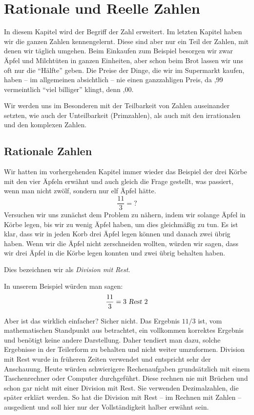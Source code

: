 

\chapter{Rationale und Reelle Zahlen}

In diesem Kapitel wird der Begriff der Zahl erweitert. Im letzten Kapitel haben wir die ganzen Zahlen kennengelernt. Diese sind aber nur ein Teil der Zahlen, mit denen wir täglich umgehen. Beim Einkaufen zum Beispiel besorgen wir zwar Äpfel und Milchtüten in ganzen Einheiten, aber schon beim Brot lassen wir uns oft nur die "`Hälfte"' geben. Die Preise der Dinge, die wir im Supermarkt kaufen, haben -- im allgemeinen absichtlich -- nie einen ganzzahligen Preis, da ,99 vermeintlich "`viel billiger"' klingt, denn ,00.

Wir werden uns im Besonderen mit der Teilbarkeit von Zahlen auseinander setzten, wie auch der Unteilbarkeit (Primzahlen), als auch mit den irrationalen und den komplexen Zahlen.

\section{Rationale Zahlen}

Wir hatten im vorhergehenden Kapitel immer wieder das Beispiel der drei Körbe mit den vier Äpfeln erwähnt und auch gleich die Frage gestellt, was passiert, wenn man nicht zwölf, sondern nur elf Äpfel hätte.
\[ \frac{11}{3} = ? \]
Versuchen wir uns zunächst dem Problem zu nähern, indem wir solange Äpfel in Körbe legen, bis wir zu wenig Äpfel haben, um dies gleichmäßig zu tun. Es ist klar, dass wir in jeden Korb drei Äpfel legen können und danach zwei übrig haben. Wenn wir die Äpfel nicht zerschneiden wollten, würden wir sagen, dass wir drei Äpfel in die Körbe legen konnten und zwei übrig behalten haben. 

\begin{definition}
Dies bezeichnen wir als \textsl{Division mit Rest}. 
\end{definition}
In unserem Beispiel würden man sagen:
\[ \frac{11}{3} = 3 \textsl{ Rest } 2 \]

Aber ist das wirklich einfacher? Sicher nicht. Das Ergebnis $11/3$ ist, vom mathematischen Standpunkt aus betrachtet, ein vollkommen korrektes Ergebnis und benötigt keine andere Darstellung. Daher tendiert man dazu, solche Ergebnisse in der Teilerform zu behalten und nicht weiter umzuformen. Division mit Rest wurde in früheren Zeiten verwendet und entspricht sehr der Anschauung. Heute würden schwierigere Rechenaufgaben grundsätzlich mit einem Taschenrechner oder Computer durchgeführt. Diese rechnen nie mit Brüchen und schon gar nicht mit einer Division mit Rest. Sie verwenden Dezimalzahlen, die später erklärt werden. So hat die Division mit Rest -- im Rechnen mit Zahlen -- ausgedient und soll hier nur der Vollständigkeit halber erwähnt sein. 

